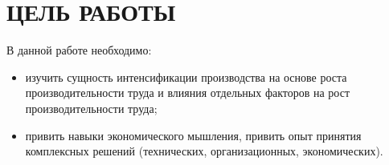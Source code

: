 \section{ЦЕЛЬ РАБОТЫ}

В данной работе необходимо:

\begin{itemize}
  \item изучить сущность интенсификации производства на основе роста производительности
    труда и влияния отдельных факторов на рост производительности труда;
  \item привить навыки экономического мышления, привить опыт принятия комплексных
    решений (технических, организационных, экономических).
\end{itemize}

\newpage
